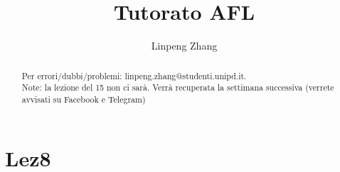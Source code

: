 \documentclass[a4paper,11pt]{article}
\begin{document}
\author{Linpeng Zhang}
\title{Tutorato AFL}
\maketitle
\begin{abstract}
    Per errori/dubbi/problemi: linpeng.zhang@studenti.unipd.it.
     \\Note: la lezione del 15 non ci sarà. Verrà recuperata la settimana successiva (verrete avvisati su Facebook e Telegram)
\end{abstract}
\tableofcontents
\section{Lez8}
\end{document}
